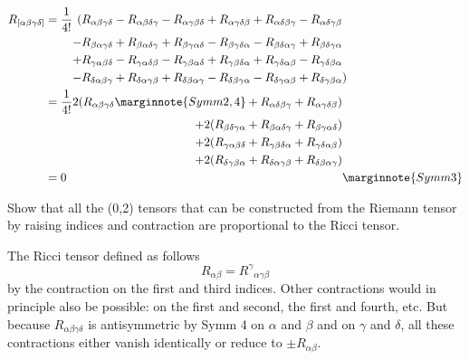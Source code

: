 \documentclass[10pt]{article}
\begin{document}
$$\begin{alignedat}{3}
	R_{[\alpha\beta\gamma\delta]}&= \frac{1}{4!}&(R_{\alpha\beta\gamma\delta}
	- R_{\alpha\beta\delta\gamma}
	- R_{\alpha\gamma\beta\delta}
	+ R_{\alpha\gamma\delta\beta}
	+ R_{\alpha\delta\beta\gamma}
	- R_{\alpha\delta\gamma\beta}&\\
	&&- R_{\beta\alpha\gamma\delta}
	+ R_{\beta\alpha\delta\gamma}
	+ R_{\beta\gamma\alpha\delta}
	- R_{\beta\gamma\delta\alpha}
	- R_{\beta\delta\alpha\gamma}
	+ R_{\beta\delta\gamma\alpha}&\\
	&&+ R_{\gamma\alpha\beta\delta}
	- R_{\gamma\alpha\delta\beta}
	- R_{\gamma\beta\alpha\delta}
	+ R_{\gamma\beta\delta\alpha}
	+ R_{\gamma\delta\alpha\beta}
	- R_{\gamma\delta\beta\alpha}&\\
	&&- R_{\delta\alpha\beta\gamma}
	+ R_{\delta\alpha\gamma\beta}
	+ R_{\delta\beta\alpha\gamma}
	- R_{\delta\beta\gamma\alpha}
	- R_{\delta\gamma\alpha\beta}
	+ R_{\delta\gamma\beta\alpha}&)\\
	&= \frac{1}{4!}&2(R_{\alpha\beta\gamma\delta}\marginnote{Symm 2, 4}
	+ R_{\alpha\delta\beta\gamma}
	+ R_{\alpha\gamma\delta\beta})&\\
	&&+ 2(R_{\beta\delta\gamma\alpha}
	+ R_{\beta\alpha\delta\gamma}
	+ R_{\beta\gamma\alpha\delta})&\\
	&&+ 2(R_{\gamma\alpha\beta\delta}
	+ R_{\gamma\beta\delta\alpha}
	+ R_{\gamma\delta\alpha\beta})&\\
	&&+ 2(R_{\delta\gamma\beta\alpha}
	+ R_{\delta\alpha\gamma\beta}
	+ R_{\delta\beta\alpha\gamma})&\\
	&=0&&\marginnote{Symm 3}
\end{alignedat}
$$


\begin{example}
	Show that all the (0,2) tensors that can be constructed from the Riemann tensor by raising indices and contraction are proportional to the Ricci tensor.
\end{example}
\sol The Ricci tensor defined as follows
$$
R_{\alpha\beta} = R^\gamma{}_{\alpha\gamma\beta}
$$
by the contraction on the first and third indices. Other contractions would in
principle also be possible: on the first and second, the first and fourth, etc. But because $R_{\alpha\beta\gamma\delta}$ is antisymmetric by Symm 4 on $\alpha$ and $\beta$ and on $\gamma$ and $\delta$, all these contractions either vanish identically or reduce to $\pm R_{\alpha\beta}$.
\end{document}
